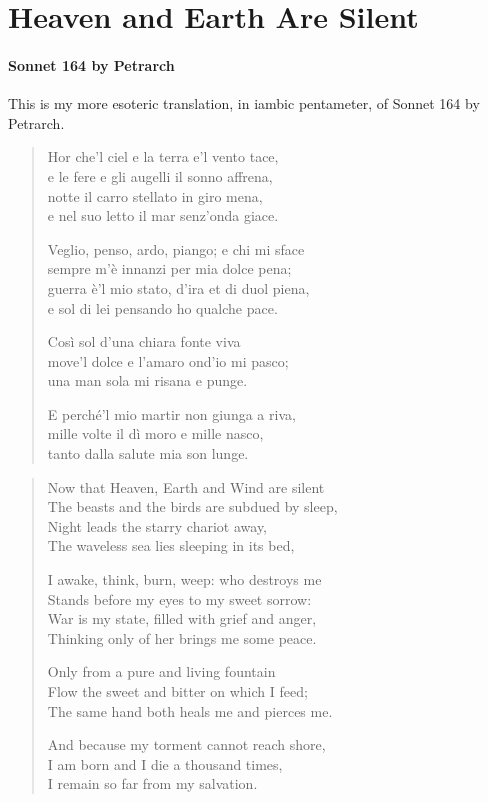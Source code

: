 \section{Heaven and Earth Are Silent}

\paragraph{Sonnet 164 by Petrarch}


This is my more esoteric translation, in iambic pentameter, of Sonnet 164 by Petrarch.

\begin{verse}
Hor che'l ciel e la terra e'l vento tace,\\
e le fere e gli augelli il sonno affrena,\\
notte il carro stellato in giro mena,\\
e nel suo letto il mar senz'onda giace.

Veglio, penso, ardo, piango; e chi mi sface\\
sempre m'è innanzi per mia dolce pena;\\
guerra è'l mio stato, d'ira et di duol piena,\\
e sol di lei pensando ho qualche pace.

Così sol d'una chiara fonte viva\\
move'l dolce e l'amaro ond'io mi pasco;\\
una man sola mi risana e punge.

E perché'l mio martir non giunga a riva,\\
mille volte il dì moro e mille nasco,\\
tanto dalla salute mia son lunge.
\end{verse}

\begin{verse}
Now that Heaven, Earth and Wind are silent\\
The beasts and the birds are subdued by sleep,\\
Night leads the starry chariot away,\\
The waveless sea lies sleeping in its bed,

I awake, think, burn, weep: who destroys me\\
Stands before my eyes to my sweet sorrow:\\
War is my state, filled with grief and anger,\\
Thinking only of her brings me some peace.

Only from a pure and living fountain\\
Flow the sweet and bitter on which I feed;\\
The same hand both heals me and pierces me.

And because my torment cannot reach shore,\\
I am born and I die a thousand times,\\
I remain so far from my salvation.
\end{verse}


